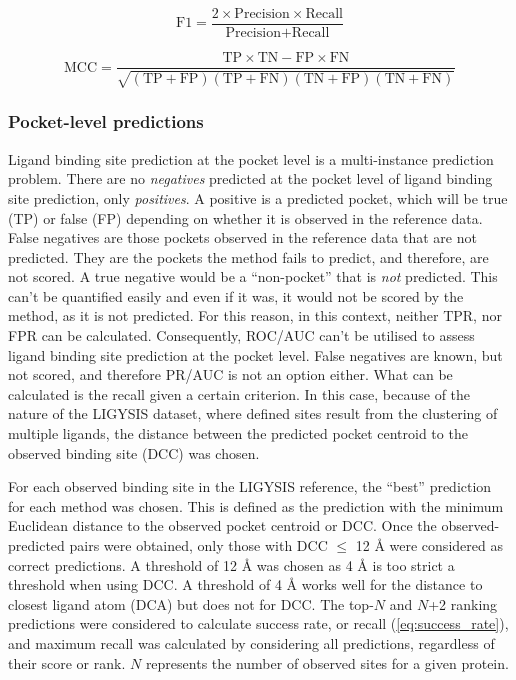 \begin{equation}
\text{F1} = \frac{2 \times \text{Precision} \times \text{Recall}}{\text{Precision} + \text{Recall}}
\label{eq:F1_score}
\end{equation}

\begin{equation}
\text{MCC} = \frac{\text{TP} \times \text{TN} - \text{FP} \times \text{FN}}{\sqrt{(\text{TP} + \text{FP})(\text{TP} + \text{FN})(\text{TN} + \text{FP})(\text{TN} + \text{FN})}}
\label{eq:MCC}
\end{equation}

\subsubsection{Pocket-level predictions}

Ligand binding site prediction at the pocket level is a multi-instance prediction problem. There are no \textit{negatives} predicted at the pocket level of ligand binding site prediction, only \textit{positives}. A positive is a predicted pocket, which will be true (TP) or false (FP) depending on whether it is observed in the reference data. False negatives are those pockets observed in the reference data that are not predicted. They are the pockets the method fails to predict, and therefore, are not scored. A true negative would be a ``non-pocket'' that is \textit{not} predicted. This can't be quantified easily and even if it was, it would not be scored by the method, as it is not predicted. For this reason, in this context, neither TPR, nor FPR can be calculated. Consequently, ROC/AUC can't be utilised to assess ligand binding site prediction at the pocket level. False negatives are known, but not scored, and therefore PR/AUC is not an option either. What can be calculated is the recall given a certain criterion. In this case, because of the nature of the LIGYSIS dataset, where defined sites result from the clustering of multiple ligands, the distance between the predicted pocket centroid to the observed binding site (DCC) was chosen.

For each observed binding site in the LIGYSIS reference, the ``best'' prediction for each method was chosen. This is defined as the prediction with the minimum Euclidean distance to the observed pocket centroid or DCC. Once the observed-predicted pairs were obtained, only those with DCC $\leq$ 12 \AA{} were considered as correct predictions. A threshold of 12 \AA{} was chosen as 4 \AA{} is too strict a threshold when using DCC. A threshold of 4 \AA{} works well for the distance to closest ligand atom (DCA) but does not for DCC. The top-$N$ and $N$+2 ranking predictions were considered to calculate success rate, or recall (\autoref{eq:success_rate}), and maximum recall was calculated by considering all predictions, regardless of their score or rank. $N$ represents the number of observed sites for a given protein.

